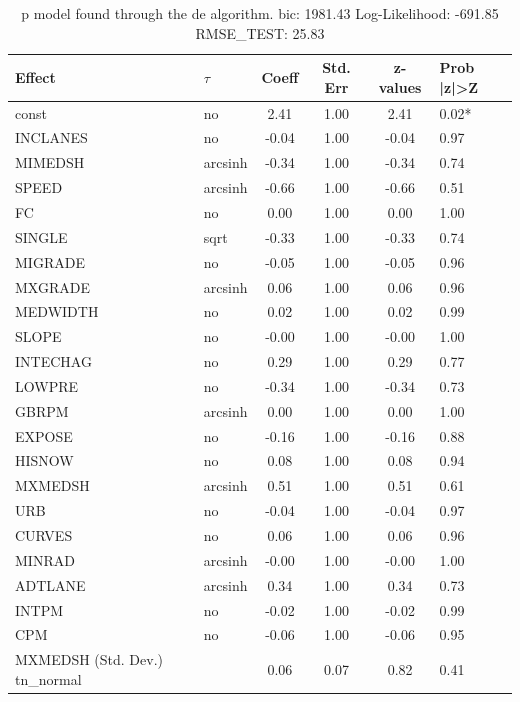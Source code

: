 \begin{table}
	\caption{p model found through the de algorithm. bic: 1981.43 Log-Likelihood: -691.85 RMSE_TEST: 25.83}
	\begin{center}
		\begin{tabular}{|l|l|c|c|c|l|}
			\hline
			Effect & $\tau$ & Coeff & Std. Err & z-values & Prob |z|>Z \\
			\hline
			const & no & 2.41 & 1.00 & 2.41 & 0.02* \\
			\hline
			INCLANES & no & -0.04 & 1.00 & -0.04 & 0.97 \\
			\hline
			MIMEDSH & arcsinh & -0.34 & 1.00 & -0.34 & 0.74 \\
			\hline
			SPEED & arcsinh & -0.66 & 1.00 & -0.66 & 0.51 \\
			\hline
			FC & no & 0.00 & 1.00 & 0.00 & 1.00 \\
			\hline
			SINGLE & sqrt & -0.33 & 1.00 & -0.33 & 0.74 \\
			\hline
			MIGRADE & no & -0.05 & 1.00 & -0.05 & 0.96 \\
			\hline
			MXGRADE & arcsinh & 0.06 & 1.00 & 0.06 & 0.96 \\
			\hline
			MEDWIDTH & no & 0.02 & 1.00 & 0.02 & 0.99 \\
			\hline
			SLOPE & no & -0.00 & 1.00 & -0.00 & 1.00 \\
			\hline
			INTECHAG & no & 0.29 & 1.00 & 0.29 & 0.77 \\
			\hline
			LOWPRE & no & -0.34 & 1.00 & -0.34 & 0.73 \\
			\hline
			GBRPM & arcsinh & 0.00 & 1.00 & 0.00 & 1.00 \\
			\hline
			EXPOSE & no & -0.16 & 1.00 & -0.16 & 0.88 \\
			\hline
			HISNOW & no & 0.08 & 1.00 & 0.08 & 0.94 \\
			\hline
			MXMEDSH & arcsinh & 0.51 & 1.00 & 0.51 & 0.61 \\
			\hline
			URB & no & -0.04 & 1.00 & -0.04 & 0.97 \\
			\hline
			CURVES & no & 0.06 & 1.00 & 0.06 & 0.96 \\
			\hline
			MINRAD & arcsinh & -0.00 & 1.00 & -0.00 & 1.00 \\
			\hline
			ADTLANE & arcsinh & 0.34 & 1.00 & 0.34 & 0.73 \\
			\hline
			INTPM & no & -0.02 & 1.00 & -0.02 & 0.99 \\
			\hline
			CPM & no & -0.06 & 1.00 & -0.06 & 0.95 \\
			\hline
			MXMEDSH (Std. Dev.) tn_normal &  & 0.06 & 0.07 & 0.82 & 0.41 \\

\end{tabular}
\end{center}
\end{table}
